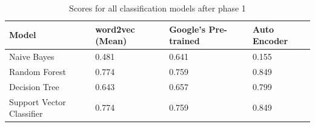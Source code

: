 \documentclass[a4paper,12pt]{article}
\begin{document}
\begin{table}[!htbp]
\caption{Scores for all classification models after phase 1}
\medskip
\centering
\begin{tabular}{|p{4.5cm}|p{2cm}|p{2.5cm}|p{2.5cm}|}
\hline
Model&word2vec (Mean)&Google's Pre-trained&Auto Encoder \\
\hline \hline
Naive Bayes & 0.481 & 0.641 & 0.155 \\ 
\hline
Random Forest & 0.774 & 0.759 & 0.849 \\  
\hline
Decision Tree & 0.643  & 0.657 & 0.799 \\
\hline
Support Vector Classifier & 0.774  & 0.759 & 0.849 \\
\hline
\end{tabular}
\label{tab:lab1}
\end{table}



 

\vskip 40pt
\end{document}
